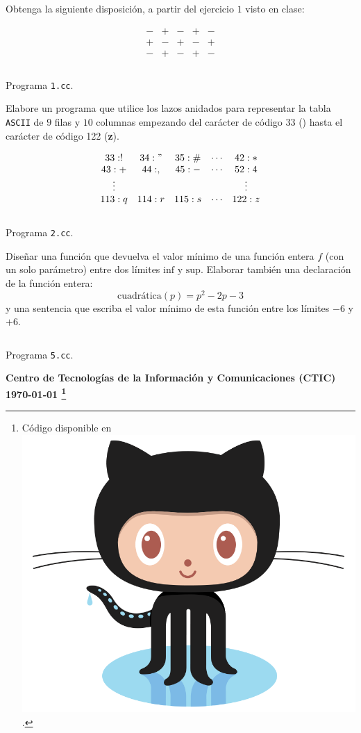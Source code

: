 \documentclass[spanish,addpoints,answers,a4paper]{exam}
\newcommand{\unmarkedfntext}[1]{%
	\begingroup
	\renewcommand\thefootnote{}\footnote{#1}%
	\addtocounter{footnote}{-1}%
	\endgroup
}
\newcommand{\mychar}{%
	\begingroup\normalfont
	\includegraphics[height=\fontcharht\font`\B]{Octocat.png}%
	\endgroup
}
\begin{document}
\begin{questions}

\question Obtenga la siguiente disposición, a partir del ejercicio $1$ visto en clase:

\[
\begin{matrix}
- & + & - & + & - \\
+ & - & + & - & + \\
- & + & - & + & -
\end{matrix}
\]

\begin{solution}
	\begin{listing}[H]
		\footnotesize
		\inputminted{cpp}{1.cc}
		\caption{Programa \texttt{1.cc}.}
		\label{lst:5.1}
\end{listing}
\end{solution}

\question Elabore un programa que utilice los lazos anidados para representar la tabla \texttt{ASCII} de $9$ filas y $10$ columnas empezando del carácter de código $33$ (\!) hasta el carácter de código 122 (\textbf{z}).

\[
\begin{matrix}
33:! & 34: " & 35:\# & \cdots & 42:* \\
43:+ & 44: , & 45:- & \cdots & 52:4 \\
\vdots & & & & \vdots \\
113:q & 114:r & 115:s & \cdots & 122:z
\end{matrix}
\]
\begin{solution}
	\begin{listing}[H]
		\footnotesize
		\inputminted{cpp}{2.cc}
		\caption{Programa \texttt{2.cc}.}
		\label{lst:5.2}
\end{listing}
\end{solution}

\setcounter{question}{4}

\question Diseñar una función que devuelva el valor mínimo de una función entera $f$ (con un solo parámetro) entre dos límites $\mathrm{inf}$ y $\mathrm{sup}$. Elaborar también una declaración de la función entera:
\begin{equation*}
\text{cuadrática}(p)=p^2-2p-3
\end{equation*}
y una sentencia que escriba el valor mínimo de esta función entre los límites $-6$ y $+6$.
\setcounter{listing}{4}
\begin{solution}
	\begin{listing}[H]
		\footnotesize
		\inputminted{cpp}{5.cc}
		\caption{Programa \texttt{5.cc}.}
		\label{lst:5.3}
\end{listing}
\end{solution}

\end{questions}

\begin{flushright}\bfseries
Centro de Tecnologías de la Información y Comunicaciones (CTIC)\\[2mm]
\today\unmarkedfntext{Código disponible en \href{https://github.com/carlosal1015/Cpp-Programming}{\mychar{}}.}
\end{flushright}
\end{document}
